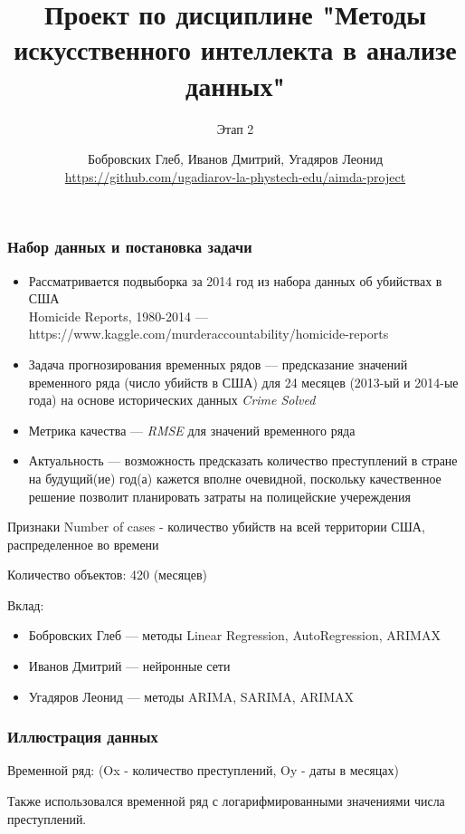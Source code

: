 \documentclass[aspectratio=169,8pt]{beamer}
\title[Проект по дисциплине МИИАД] {Проект по дисциплине "Методы искусственного интеллекта в анализе данных"}
\subtitle{Этап 2}
\author[Бобровских, Иванов, Угадяров] {Бобровских Глеб, Иванов Дмитрий, Угадяров Леонид \\ \tiny\url{https://github.com/ugadiarov-la-phystech-edu/aimda-project}}
\institute{Группа 4}
\begin{document}
\begin{frame}
\titlepage
\end{frame}

\begin{frame}
\frametitle{Набор данных и постановка задачи}

\begin{itemize}
\item { Рассматривается подвыборка за 2014 год из набора данных об убийствах в США \\ Homicide Reports, 1980-2014 --- https://www.kaggle.com/murderaccountability/homicide-reports }
\item Задача прогнозирования временных рядов --- предсказание значений временного ряда (число убийств в США) для 24 месяцев (2013-ый и 2014-ые года) на основе исторических данных \emph {Crime Solved}
\item Метрика качества --- \emph {RMSE} для значений временного ряда
\item {Актуальность --- возможность предсказать количество преступлений в стране на будущий(ие) год(а) кажется вполне очевидной, поскольку качественное решение позволит планировать затраты на полицейские учереждения  }
\end{itemize}

\begin{block}{Признаки}
Number of cases - количество убийств на всей территории США, распределенное во времени 
\end{block}

Количество объектов:  420 (месяцев)\newline

Вклад:
\begin{itemize}
\item Бобровских Глеб --- методы Linear Regression, AutoRegression, ARIMAX
\item Иванов Дмитрий --- нейронные сети
\item Угадяров Леонид --- методы ARIMA, SARIMA, ARIMAX
\end{itemize}

\end{frame}

\begin{frame}
\frametitle{Иллюстрация данных}

Временной ряд: (Ox - количество преступлений, Oy - даты в месяцах)

\begin{figure}[h!]
        \captionsetup{labelformat=empty}
        \vspace{-2.3em}
        \caption[scale=0.25]{}
\end{figure}



Также использовался временной ряд с логарифмированными значениями числа преступлений.

\end{frame}
\end{document}
